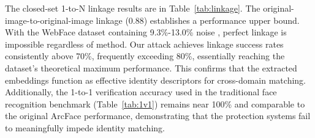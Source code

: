 \begin{table}
    \caption{Comparison of protection claims. FracFace measures the proportion of distorted frequency channels; our metric measures identity recovery success via commercial verification. We demonstrate that high channel disruption, as reported in prior work, does not prevent identity extraction.}
    \label{tab:res}
    
    \centering
\end{table}
The closed-set 1-to-N linkage results are in Table~\ref{tab:linkage}. The original-image-to-original-image linkage (0.88) establishes a performance upper bound. With the WebFace dataset containing 9.3\%-13.0\% noise \cite{wang_devil_2018}, perfect linkage is impossible regardless of method. Our attack achieves linkage success rates consistently above 70\%, frequently exceeding 80\%, essentially reaching the dataset's theoretical maximum performance. This confirms that the extracted embeddings function as effective identity descriptors for cross-domain matching. Additionally, the 1-to-1 verification accuracy used in the traditional face recognition benchmark (Table~\ref{tab:1v1}) remains near 100\% and comparable to the original ArcFace performance, demonstrating that the protection systems fail to meaningfully impede identity matching.


